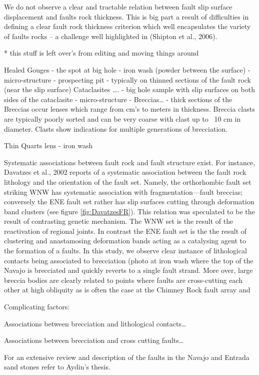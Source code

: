 \documentclass[12pt,a4paper]{article}
\begin{document}
We do not observe a clear and tractable relation between fault slip surface displacement and faults rock thickness. This is big part a result of difficulties in defining a clear fault rock thickness criterion which well encapsulates the variety of faults rocks -- a challenge well highlighted in  (Shipton et al., 2006).

* this stuff is left over's from  editing and moving things around

Healed Gouges
-	the spot at big hole
-	iron wash (powder between the surface)
-	micro-structure
-	prospecting pit
-	typically on thinned sections of the fault rock (near the slip surface)
Cataclasites ….
-	big hole sample with slip surfaces on both sides of the cataclasite
-	micro-structure
-	
Breccias…
-	thick sections  of the 
Breccias occur lenses which range from cm’s to meters in thickness. Breccia clasts are typically poorly sorted and can be very coarse with clast up to ~10 cm in diameter. Clasts show indications for multiple generations of brecciation.


Thin Quarts lens
-	iron wash


Systematic associations between fault rock and fault structure exist. For instance, Davatzes et al., 2002 reports of a systematic association between the fault rock lithology and the orientation of the fault set. Namely, the orthorhombic fault set striking WNW has systematic association with fragmentation—fault breccias; conversely the ENE fault set rather has slip surfaces cutting through deformation band clusters (see figure \ref{fig:DavatzesFR}). This relation was speculated to be the result of contrasting genetic mechanism. The WNW set is the result of the reactivation of regional joints. In contrast the ENE fault set is the the result of clustering and anastamosing deformation bands acting as a catalysing agent to the formation of a faults.
In this study, we observe clear instance of lithological contacts being associated to brecciation (photo at iron wash where the top of the Navajo is brecciated and quickly reverts to a single fault strand. More over, large breccia bodies are clearly related to points where faults are cross-cutting each other at high obliquity as is often the case at the Chimney Rock fault array and 

Complicating factors:

Associations between brecciation and lithological contacts…

Associations between brecciation and cross cutting faults…

For an extensive review and description of the faults in the Navajo and Entrada sand stones refer to Aydin’s thesis. 
\end{document}
